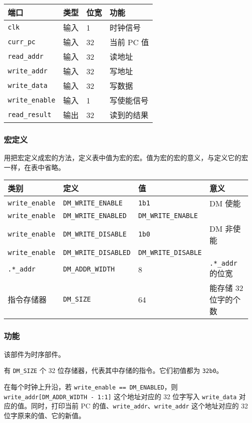\begin{longtable}[]{@{}llll@{}}
\toprule
端口 & 类型 & 位宽 & 功能\tabularnewline
\midrule
\endhead
\texttt{clk} & 输入 & 1 & 时钟信号\tabularnewline
\texttt{curr\_pc} & 输入 & 32 & 当前 PC 值\tabularnewline
\texttt{read\_addr} & 输入 & 32 & 读地址\tabularnewline
\texttt{write\_addr} & 输入 & 32 & 写地址\tabularnewline
\texttt{write\_data} & 输入 & 32 & 写数据\tabularnewline
\texttt{write\_enable} & 输入 & 1 & 写使能信号\tabularnewline
\texttt{read\_result} & 输出 & 32 & 读到的结果\tabularnewline
\bottomrule
\end{longtable}

\hypertarget{ux5b8fux5b9aux4e49-6}{%
\subsubsection{宏定义}\label{ux5b8fux5b9aux4e49-6}}

用把宏定义成宏的方法，定义表中值为宏的宏。值为宏的宏的意义，与定义它的宏一样，在表中省略。

\begin{longtable}[]{@{}llll@{}}
\toprule
类别 & 定义 & 值 & 意义\tabularnewline
\midrule
\endhead
\texttt{write\_enable} & \texttt{DM\_WRITE\_ENABLE} &
\texttt{1\textquotesingle{}b1} & DM 使能\tabularnewline
\texttt{write\_enable} & \texttt{DM\_WRITE\_ENABLED} &
\texttt{DM\_WRITE\_ENABLE} &\tabularnewline
\texttt{write\_enable} & \texttt{DM\_WRITE\_DISABLE} &
\texttt{1\textquotesingle{}b0} & DM 非使能\tabularnewline
\texttt{write\_enable} & \texttt{DM\_WRITE\_DISABLED} &
\texttt{DM\_WRITE\_DISABLE} &\tabularnewline
\texttt{.*\_addr} & \texttt{DM\_ADDR\_WIDTH} & 8 & \texttt{.*\_addr}
的位宽\tabularnewline
指令存储器 & \texttt{DM\_SIZE} & 64 & 能存储 32
位字的个数\tabularnewline
\bottomrule
\end{longtable}

\hypertarget{ux529fux80fd-8}{%
\subsubsection{功能}\label{ux529fux80fd-8}}

该部件为时序部件。

有 \texttt{DM\_SIZE} 个 32 位存储器，代表其中存储的指令。它们初值都为
\texttt{32\textquotesingle{}b0}。

在每个时钟上升沿，若 \texttt{write\_enable\ ==\ DM\_ENABLED}，则
\texttt{write\_addr{[}DM\_ADDR\_WIDTH\ -\ 1:1{]}} 这个地址对应的 32
位字写入 \texttt{write\_data} 对应的值。同时，打印当前 PC
的值、\texttt{write\_addr}、\texttt{write\_addr} 这个地址对应的 32
位字原来的值、它的新值。

